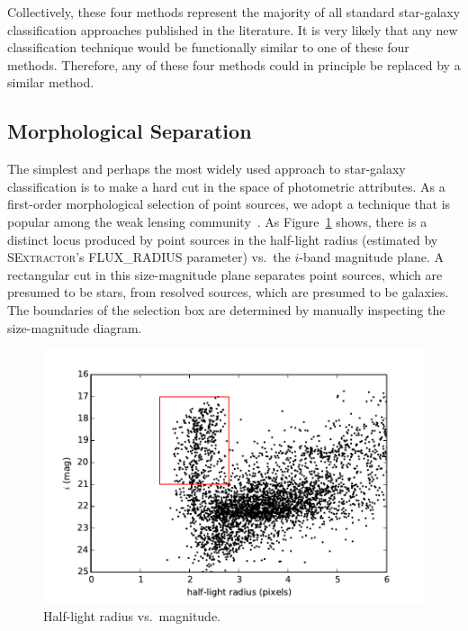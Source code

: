 \documentclass[useAMS,usenatbib]{mn2e}
\begin{document}
Collectively, these four methods represent the majority of all
standard star-galaxy classification approaches published in the literature.
It is very likely that any new classification technique would be
functionally similar to one of these four methods.
Therefore, any of these four methods could in principle be replaced by a similar method. 


\subsection{Morphological Separation}

The simplest and perhaps the most widely used approach
to star-galaxy classification is
to make a hard cut in the space of photometric attributes.
As a first-order morphological selection of point sources,
we adopt a technique that is popular among the weak lensing 
community~\citep*{Kaiser1995}.
As Figure~\ref{fig:morph} shows, there is a distinct locus
produced by point sources in the half-light radius
(estimated by \textsc{SExtractor}'s FLUX\_RADIUS parameter)
vs.\ the $i$-band magnitude plane.
A rectangular cut in this size-magnitude plane separates point sources,
which are presumed to be stars,
from resolved sources,
which are presumed to be galaxies.
The boundaries of the selection box are determined by
manually inspecting the size-magnitude diagram.


\begin{figure}
  \centering
  \includegraphics[width=\columnwidth]{figures/morph.pdf}
  \caption{Half-light radius vs.\ magnitude.}
  \label{fig:morph}
\end{figure}
\end{document}
